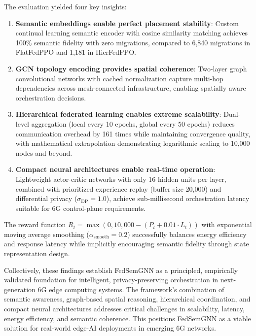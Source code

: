 The evaluation yielded four key insights:
\begin{enumerate}
	\item \textbf{Semantic embeddings enable perfect placement stability}: Custom continual learning semantic encoder with cosine similarity matching achieves 100\% semantic fidelity with zero migrations, compared to 6,840 migrations in FlatFedPPO and 1,181 in HierFedPPO.
	
	\item \textbf{GCN topology encoding provides spatial coherence}: Two-layer graph convolutional networks with cached normalization capture multi-hop dependencies across mesh-connected infrastructure, enabling spatially aware orchestration decisions.
	
	\item \textbf{Hierarchical federated learning enables extreme scalability}: Dual-level aggregation (local every 10 epochs, global every 50 epochs) reduces communication overhead by 161 times while maintaining convergence quality, with mathematical extrapolation demonstrating logarithmic scaling to 10,000 nodes and beyond.
	
	\item \textbf{Compact neural architectures enable real-time operation}: Lightweight actor-critic networks with only 16 hidden units per layer, combined with prioritized experience replay (buffer size 20,000) and differential privacy ($\sigma_{\text{DP}} = 1.0$), achieve sub-millisecond orchestration latency suitable for 6G control-plane requirements.
\end{enumerate}

The reward function $R_t = \max(0, 10{,}000 - (P_t + 0.01 \cdot L_t))$ with exponential moving average smoothing ($\alpha_{\text{smooth}} = 0.2$) successfully balances energy efficiency and response latency while implicitly encouraging semantic fidelity through state representation design.

Collectively, these findings establish FedSemGNN as a principled, empirically validated foundation for intelligent, privacy-preserving orchestration in next-generation 6G edge computing systems. The framework's combination of semantic awareness, graph-based spatial reasoning, hierarchical coordination, and compact neural architectures addresses critical challenges in scalability, latency, energy efficiency, and semantic coherence. This positions FedSemGNN as a viable solution for real-world edge-AI deployments in emerging 6G networks.
